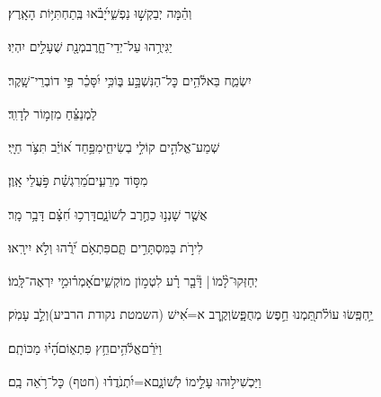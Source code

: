 \documentclass[12pt]{article}
\newcommand{\loc}[1]{\textsuperscript{\locf{#1}}}
\begin{document}
{\loc{ י}~}‏וְהֵ֗מָּה  יְבַקְשׁ֣וּ נַפְשִׁ֑י{\hfill}יָ֝בֹ֗אוּ בְּֽתַחְתִּיּ֥וֹת הָאָֽרֶץ׃\par

{\loc{ יא}~}‏יַגִּירֻ֥הוּ עַל־יְדֵי־חָ֑רֶב{\hfill}מְנָ֖ת שֻׁעָלִ֣ים יִהְיֽוּ׃\par

{\loc{ יב}~}‏{\hfill}יִשְׂמַ֢ח בֵּאלֹ֫הִ֥ים\newline\hspace*{.5em} כׇּל־הַנִּשְׁבָּ֣ע בּ֑וֹ{\hfill}כִּ֥י יִ֝סָּכֵ֗ר פִּ֣י דוֹבְרֵי־שָֽׁקֶר׃\par\pend
\ledpb
\pstart[\subsection*{\textcolor{red}{פרק סד}}]\label{פרק סד}
{\loc{ א}~}‏לַמְנַצֵּ֗חַ מִזְמ֥וֹר לְדָוִֽד׃\par

{\loc{ ב}~}‏שְׁמַע־אֱלֹהִ֣ים קוֹלִ֣י בְשִׂיחִ֑י{\hfill}מִפַּ֥חַד א֝וֹיֵ֗ב תִּצֹּ֥ר חַיָּֽי׃\par

{\loc{ ג}~}‏ מִסּ֣וֹד מְרֵעִ֑ים{\hfill}מֵ֝רִגְשַׁ֗ת פֹּ֣עֲלֵי אָֽוֶן׃\par

{\loc{ ד}~}‏אֲשֶׁ֤ר שָׁנְנ֣וּ כַחֶ֣רֶב לְשׁוֹנָ֑ם{\hfill}דָּרְכ֥וּ חִ֝צָּ֗ם דָּבָ֥ר מָֽר׃\par

{\loc{ ה}~}‏לִירֹ֣ת בַּמִּסְתָּרִ֣ים תָּ֑ם{\hfill}פִּתְאֹ֥ם יֹ֝רֻ֗הוּ וְלֹ֣א יִירָֽאוּ׃\par

{\loc{ ו}~}‏יְחַזְּקוּ־לָ֨מוֹ |  דָּ֘בָ֤ר רָ֗ע{\hfill} לִטְמ֣וֹן מוֹקְשִׁ֑ים\newline\hspace*{.5em}אָ֝מְר֗וּ{\hfill}מִ֣י יִרְאֶה־לָּֽמוֹ׃\par

{\loc{ ז}~}‏יַ֥חְפְּֽשׂוּ עוֹלֹ֗ת{\hfill}תַּ֭מְנוּ חֵ֣פֶשׂ מְחֻפָּ֑שׂ\newline\hspace*{.5em}וְקֶ֥רֶב א=אִ֝ישׁ (השמטת נקודת הרביע){\hfill}וְלֵ֣ב עָמֹֽק׃\par

{\loc{ ח}~}‏וַיֹּרֵ֗ם{\hfill}אֱלֹ֫הִ֥ים\newline\hspace*{.5em}חֵ֥ץ פִּתְא֑וֹם{\hfill}הָ֝י֗וּ מַכּוֹתָֽם׃\par

{\loc{ ט}~}‏וַיַּכְשִׁיל֣וּהוּ עָלֵ֣ימוֹ לְשׁוֹנָ֑ם{\hfill}א=יִ֝תְנֹדֲד֗וּ (חטף) כׇּל־רֹ֥אֵה בָֽם׃\par
\end{document}
